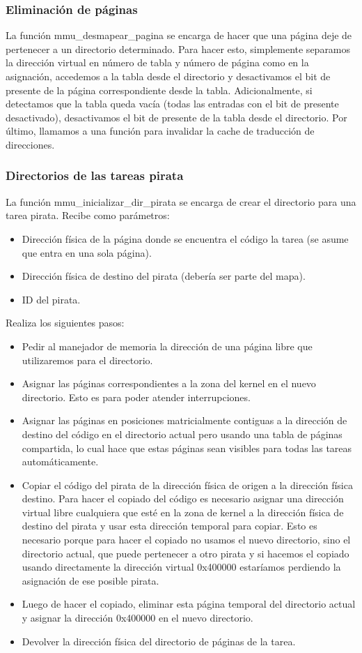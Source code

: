 \subsubsection{Eliminación de páginas}
La función mmu\_desmapear\_pagina se encarga de hacer que una página deje de pertenecer a un directorio determinado. Para hacer esto, simplemente separamos la dirección virtual en número de tabla y número de página como en la asignación, accedemos a la tabla desde el directorio y desactivamos el bit de presente de la página correspondiente desde la tabla. Adicionalmente, si detectamos que la tabla queda vacía (todas las entradas con el bit de presente desactivado), desactivamos el bit de presente de la tabla desde el directorio. Por último, llamamos a una función para invalidar la cache de traducción de direcciones.

\subsubsection{Directorios de las tareas pirata}
La función mmu\_inicializar\_dir\_pirata se encarga de crear el directorio para una tarea pirata.\newline
Recibe como parámetros:
\begin{itemize}
\item Dirección física de la página donde se encuentra el código la tarea (se asume que entra en una sola página).
\item Dirección física de destino del pirata (debería ser parte del mapa).
\item ID del pirata.
\end{itemize}
Realiza los siguientes pasos:
\begin{itemize}
\item Pedir al manejador de memoria la dirección de una página libre que utilizaremos para el directorio.
\item Asignar las páginas correspondientes a la zona del kernel en el nuevo directorio. Esto es para poder atender interrupciones.
\item Asignar las páginas en posiciones matricialmente contiguas a la dirección de destino del código en el directorio actual pero usando una tabla de páginas compartida, lo cual hace que estas páginas sean visibles para todas las tareas automáticamente.
\item Copiar el código del pirata de la dirección física de origen a la dirección física destino. Para hacer el copiado del código es necesario asignar una dirección virtual libre cualquiera que esté en la zona de kernel a la dirección física de destino del pirata y usar esta dirección temporal para copiar. Esto es necesario porque para hacer el copiado no usamos el nuevo directorio, sino el directorio actual, que puede pertenecer a otro pirata y si hacemos el copiado usando directamente la dirección virtual 0x400000 estaríamos perdiendo la asignación de ese posible pirata.
\item Luego de hacer el copiado, eliminar esta página temporal del directorio actual y asignar la dirección 0x400000 en el nuevo directorio.
\item Devolver la dirección física del directorio de páginas de la tarea.
\end{itemize}

